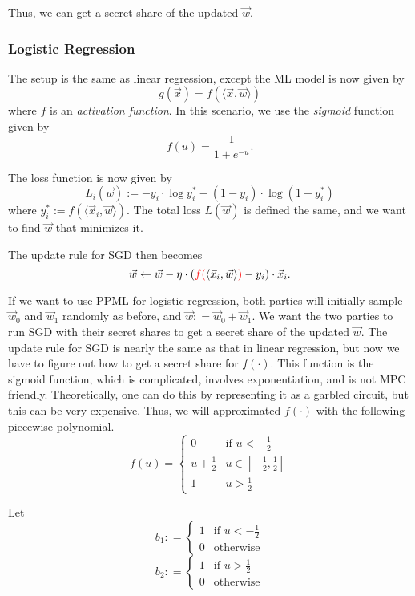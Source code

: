 Thus, we can get a secret share of the updated $\vec{w}$.

\subsubsection{Logistic Regression}

The setup is the same as linear regression, except the ML model is now given by
$$g(\vec{x}) = f(\langle \vec{x}, \vec{w}\rangle)$$
where $f$ is an \textit{activation function}. In this scenario, we use the \textit{sigmoid} function given by
$$f(u) = \frac{1}{1 + e^{-u}}.$$

The loss function is now given by
$$L_i(\vec{w}):= -y_i \cdot \log y_i^* - (1-y_i) \cdot \log(1-y_i^*)$$
where $y_i^* := f(\langle \vec{x}_i, \vec{w}\rangle)$. The total loss $L(\vec{w})$ is defined the same, and we want to find $\vec{w}$ that minimizes it.

The update rule for SGD then becomes
$$\vec{w} \gets \vec{w} - \eta \cdot ({\color{red} f(}\langle \vec{x}_i, \vec{w}\rangle{\color{red} )} - y_i)\cdot \vec{x}_i.$$

If we want to use PPML for logistic regression, both parties will initially sample $\vec{w}_0$ and $\vec{w}_1$ randomly as before, and $\vec{w}: = \vec{w}_0 + \vec{w}_1$. We want the two parties to run SGD with their secret shares to get a secret share of the updated $\vec{w}$. The update rule for SGD is nearly the same as that in linear regression, but now we have to figure out how to get a secret share for $f(\cdot)$. This function is the sigmoid function, which is complicated, involves exponentiation, and is not MPC friendly. Theoretically, one can do this by representing it as a garbled circuit, but this can be very expensive. Thus, we will approximated $f(\cdot)$ with the following piecewise polynomial.
$$f(u) = \begin{cases}
    0 & \text{if }u < -\frac{1}{2}\\
    u + \frac{1}{2} & u \in [-\frac{1}{2}, \frac{1}{2}]\\
    1 & u > \frac{1}{2}
\end{cases}$$

Let
$$b_1 : = \begin{cases}
    1 & \text{if }u < -\frac{1}{2}\\
    0 & \text{otherwise}
\end{cases}$$
$$b_2 : = \begin{cases}
    1 & \text{if }u > \frac{1}{2}\\
    0 & \text{otherwise}
\end{cases}$$


